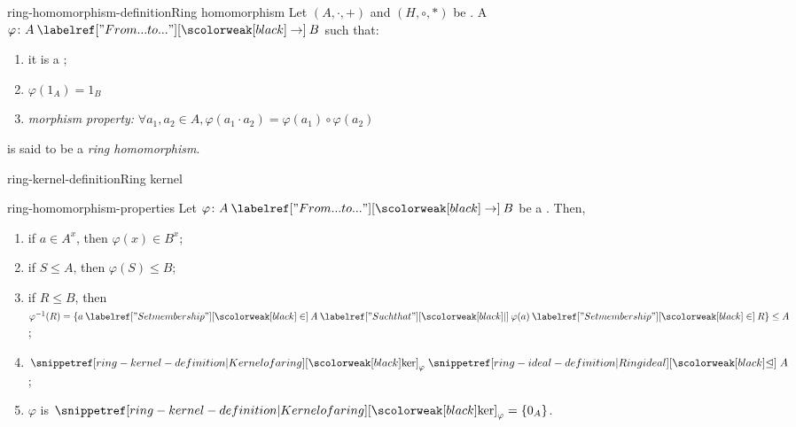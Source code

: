 \documentclass[preview]{standalone}
\begin{document}
\begin{snippetdefinition}{ring-homomorphism-definition}{Ring homomorphism}
    Let \((A, \cdot, +)\) and \((H, \circ, \ast)\) be \ring[rings].
    A \function \(\varphi\colon A \fromto B\)
    such that:
    \begin{enumerate}
        \item it is a \grouphomomorphism;
        \item \(\varphi(1_A) = 1_B\)
        \item \emph{morphism property:} \(\forall a_1,a_2 \in A, \varphi(a_1\cdot a_2) = \varphi(a_1) \circ \varphi(a_2)\)
    \end{enumerate}
    is said to be a \emph{ring homomorphism}.
\end{snippetdefinition}

\begin{snippetdefinition}{ring-kernel-definition}{Ring kernel}
    \todo
\end{snippetdefinition}

\begin{snippetproposition}{ring-homomorphism-properties}{}
    Let \(\varphi \colon A \fromto B\) be a \ringhomomorphism. Then,
    \begin{enumerate}
        \item if \(a \in A^x\), then \(\varphi(x) \in B^x\);
        \item if \(S \leq A\), then \(\varphi(S) \leq B\);
        \item if \(R \leq B\), then \(\varphi^{-1}(R) = \{a \in A \suchthat \varphi(a) \in R\} \leq A\);
        \item \(\ringker_\varphi \idealin A\);
        \item \(\varphi\) is \injective \ifandonlyif \(\ringker_\varphi = \{0_A\}\).
    \end{enumerate}
\end{snippetproposition}
\end{document}
